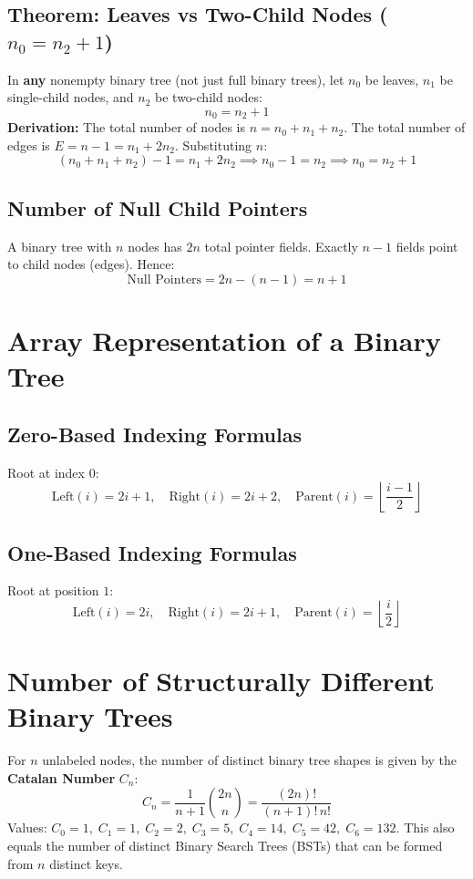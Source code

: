 \subsection{Theorem: Leaves vs Two-Child Nodes ($n_0 = n_2 + 1$)}
In \textbf{any} nonempty binary tree (not just full binary trees), let $n_0$ be leaves, $n_1$ be single-child nodes, and $n_2$ be two-child nodes:
\[
\boxed{n_0 = n_2 + 1}
\]
\textbf{Derivation:}
The total number of nodes is $n = n_0 + n_1 + n_2$.
The total number of edges is $E = n - 1 = n_1 + 2n_2$.
Substituting $n$:
\[
(n_0 + n_1 + n_2) - 1 = n_1 + 2n_2 \implies n_0 - 1 = n_2 \implies \boxed{n_0 = n_2 + 1}
\]

\subsection{Number of Null Child Pointers}
A binary tree with $n$ nodes has $2n$ total pointer fields. Exactly $n - 1$ fields point to child nodes (edges). Hence:
\[
\boxed{\text{Null Pointers} = 2n - (n - 1) = n + 1}
\]

\section{Array Representation of a Binary Tree}

\subsection{Zero-Based Indexing Formulas}
Root at index $0$:
\[
\text{Left}(i) = 2i + 1, \quad \text{Right}(i) = 2i + 2, \quad \text{Parent}(i) = \left\lfloor \frac{i - 1}{2} \right\rfloor
\]

\subsection{One-Based Indexing Formulas}
Root at position $1$:
\[
\text{Left}(i) = 2i, \quad \text{Right}(i) = 2i + 1, \quad \text{Parent}(i) = \left\lfloor \frac{i}{2} \right\rfloor
\]

\section{Number of Structurally Different Binary Trees}

For $n$ unlabeled nodes, the number of distinct binary tree shapes is given by the \textbf{Catalan Number} $C_n$:
\[
\boxed{C_n = \frac{1}{n+1} \binom{2n}{n} = \frac{(2n)!}{(n+1)! \, n!}}
\]
Values: $C_0=1, \; C_1=1, \; C_2=2, \; C_3=5, \; C_4=14, \; C_5=42, \; C_6=132$.
This also equals the number of distinct Binary Search Trees (BSTs) that can be formed from $n$ distinct keys.


